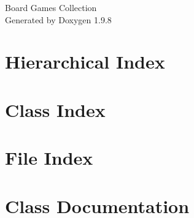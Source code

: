 \documentclass[twoside]{book}
\newcommand{\+}{\discretionary{\mbox{\scriptsize$\hookleftarrow$}}{}{}}
\newcommand{\clearemptydoublepage}{%
    \newpage{\pagestyle{empty}\cleardoublepage}%
  }
\begin{document}
  \raggedbottom
    \hypersetup{pageanchor=false,
                bookmarksnumbered=true,
                pdfencoding=unicode
               }
  \begin{titlepage}
  \vspace*{7cm}
  \begin{center}%
  {\Large Board Games Collection}\\
  \vspace*{1cm}
  {\large Generated by Doxygen 1.9.8}\\
  \end{center}
  \end{titlepage}
  \clearemptydoublepage
  \tableofcontents
  \clearemptydoublepage
  \hypersetup{pageanchor=true}
\chapter{Hierarchical Index}

\chapter{Class Index}

\chapter{File Index}

\chapter{Class Documentation}

































\end{document}
